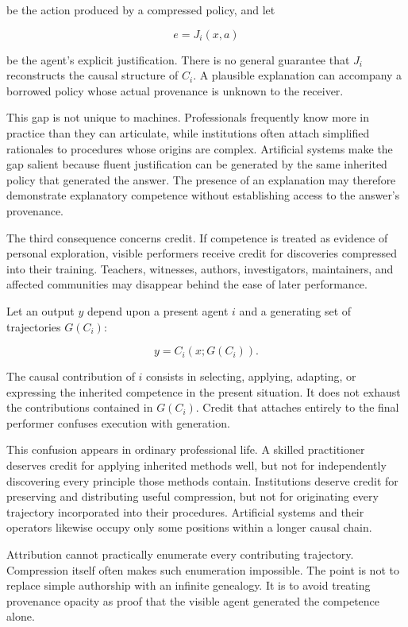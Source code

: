 \documentclass[11pt]{article}
\begin{document}
be the action produced by a compressed policy, and let

\[
e=J_i(x,a)
\]

be the agent's explicit justification. There is no general guarantee that $J_i$ reconstructs the causal structure of $C_i$. A plausible explanation can accompany a borrowed policy whose actual provenance is unknown to the receiver.

This gap is not unique to machines. Professionals frequently know more in practice than they can articulate, while institutions often attach simplified rationales to procedures whose origins are complex. Artificial systems make the gap salient because fluent justification can be generated by the same inherited policy that generated the answer. The presence of an explanation may therefore demonstrate explanatory competence without establishing access to the answer's provenance.

The third consequence concerns credit. If competence is treated as evidence of personal exploration, visible performers receive credit for discoveries compressed into their training. Teachers, witnesses, authors, investigators, maintainers, and affected communities may disappear behind the ease of later performance.

Let an output $y$ depend upon a present agent $i$ and a generating set of trajectories $G(C_i)$:

\[
y
=
C_i(x;G(C_i)).
\]

The causal contribution of $i$ consists in selecting, applying, adapting, or expressing the inherited competence in the present situation. It does not exhaust the contributions contained in $G(C_i)$. Credit that attaches entirely to the final performer confuses execution with generation.

This confusion appears in ordinary professional life. A skilled practitioner deserves credit for applying inherited methods well, but not for independently discovering every principle those methods contain. Institutions deserve credit for preserving and distributing useful compression, but not for originating every trajectory incorporated into their procedures. Artificial systems and their operators likewise occupy only some positions within a longer causal chain.

Attribution cannot practically enumerate every contributing trajectory. Compression itself often makes such enumeration impossible. The point is not to replace simple authorship with an infinite genealogy. It is to avoid treating provenance opacity as proof that the visible agent generated the competence alone.
\end{document}
